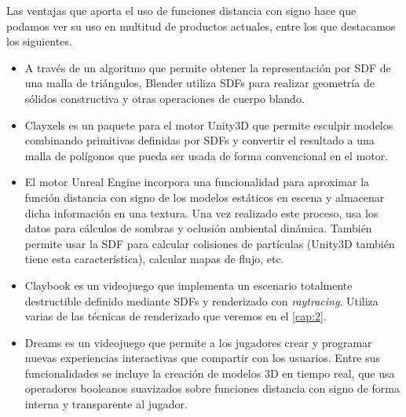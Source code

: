 Las ventajas que aporta el uso de funciones distancia con signo hace que podamos ver su uso en multitud de productos actuales, entre los que destacamos los siguientes.
\begin{itemize}
    \item A través de un algoritmo que permite obtener la representación por SDF de una malla de triángulos, Blender \cite{repo:blender} utiliza SDFs para realizar geometría de sólidos constructiva y otras operaciones de cuerpo blando.
    \item Clayxels \cite{clayxels} es un paquete para el motor Unity3D que permite esculpir modelos combinando primitivas definidas por SDFs y convertir el resultado a una malla de polígonos que pueda ser usada de forma convencional en el motor.
    \item El motor Unreal Engine \cite{unreal} incorpora una funcionalidad para aproximar la función distancia con signo de los modelos estáticos en escena y almacenar dicha información en una textura. Una vez realizado este proceso, usa los datos para cálculos de sombras y oclusión ambiental dinámica. También permite usar la SDF para calcular colisiones de partículas (Unity3D también tiene esta característica), calcular mapas de flujo, etc.   
    \item Claybook \cite{claybook} es un videojuego que implementa un escenario totalmente destructible definido mediante SDFs y renderizado con \textit{raytracing}. Utiliza varias de las técnicas de renderizado que veremos en el \autoref{cap:2}.
    \item Dreams \cite{game:dreams} es un videojuego que permite a los jugadores crear y programar nuevas experiencias interactivas que compartir con los usuarios. Entre sus funcionalidades se incluye la creación de modelos 3D en tiempo real, que usa operadores booleanos suavizados sobre funciones distancia con signo de forma interna y transparente al jugador.
\end{itemize}
